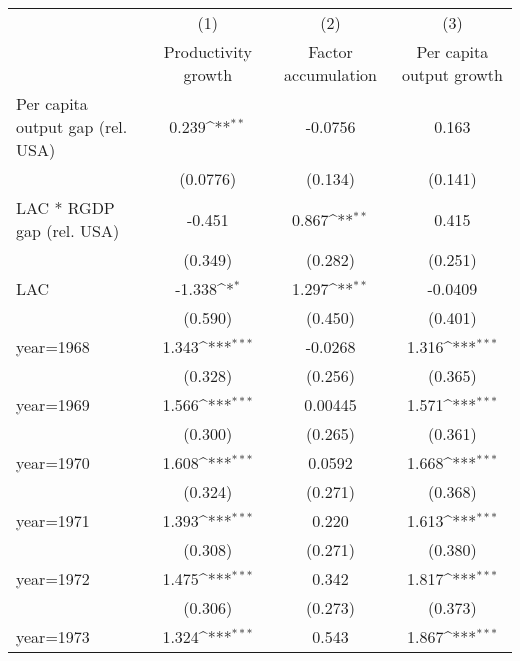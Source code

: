 {
\def\sym#1{\ifmmode^{#1}\else\(^{#1}\)\fi}
\begin{tabular}{l*{3}{c}}
\hline\hline
                    &\multicolumn{1}{c}{(1)}&\multicolumn{1}{c}{(2)}&\multicolumn{1}{c}{(3)}\\
                    &\multicolumn{1}{c}{Productivity growth}&\multicolumn{1}{c}{Factor accumulation}&\multicolumn{1}{c}{Per capita output growth}\\
\hline
Per capita output gap (rel. USA)&       0.239\sym{**} &     -0.0756         &       0.163         \\
                    &    (0.0776)         &     (0.134)         &     (0.141)         \\
[1em]
LAC * RGDP gap (rel. USA)&      -0.451         &       0.867\sym{**} &       0.415         \\
                    &     (0.349)         &     (0.282)         &     (0.251)         \\
[1em]
LAC                 &      -1.338\sym{*}  &       1.297\sym{**} &     -0.0409         \\
                    &     (0.590)         &     (0.450)         &     (0.401)         \\
[1em]
year=1968           &       1.343\sym{***}&     -0.0268         &       1.316\sym{***}\\
                    &     (0.328)         &     (0.256)         &     (0.365)         \\
[1em]
year=1969           &       1.566\sym{***}&     0.00445         &       1.571\sym{***}\\
                    &     (0.300)         &     (0.265)         &     (0.361)         \\
[1em]
year=1970           &       1.608\sym{***}&      0.0592         &       1.668\sym{***}\\
                    &     (0.324)         &     (0.271)         &     (0.368)         \\
[1em]
year=1971           &       1.393\sym{***}&       0.220         &       1.613\sym{***}\\
                    &     (0.308)         &     (0.271)         &     (0.380)         \\
[1em]
year=1972           &       1.475\sym{***}&       0.342         &       1.817\sym{***}\\
                    &     (0.306)         &     (0.273)         &     (0.373)         \\
[1em]
year=1973           &       1.324\sym{***}&       0.543         &       1.867\sym{***}\\

\end{tabular}}
